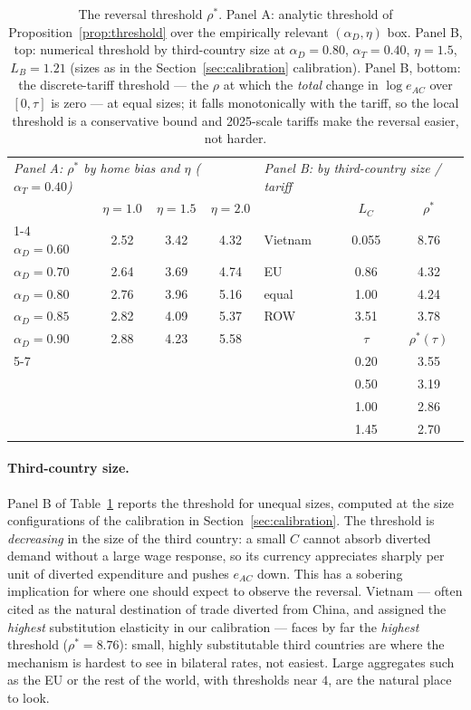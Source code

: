 \documentclass[11pt]{article}
\theoremstyle{plain}
\theoremstyle{remark}
\numberwithin{lemma}{section}
\numberwithin{proposition}{section}
\numberwithin{corollary}{section}
\newenvironment{revblock}{\par\begingroup\color{RevBlue}}{\endgroup\par}
\begin{document}
\begin{revblock}
\begin{table}[htbp]
\centering
\begin{tabular}{lccc@{\hspace{1.2cm}}lcc}
\hline\hline
\multicolumn{4}{l}{\textit{Panel A: $\rho^*$ by home bias and $\eta$ ($\alpha_T = 0.40$)}} & \multicolumn{3}{l}{\textit{Panel B: by third-country size / tariff}} \\[2pt]
 & $\eta = 1.0$ & $\eta = 1.5$ & $\eta = 2.0$ & & $L_C$ & $\rho^*$ \\
\cline{1-4}\cline{5-7}
$\alpha_D = 0.60$ & 2.52 & 3.42 & 4.32 & Vietnam & 0.055 & 8.76 \\
$\alpha_D = 0.70$ & 2.64 & 3.69 & 4.74 & EU & 0.86 & 4.32 \\
$\alpha_D = 0.80$ & 2.76 & 3.96 & 5.16 & equal & 1.00 & 4.24 \\
$\alpha_D = 0.85$ & 2.82 & 4.09 & 5.37 & ROW & 3.51 & 3.78 \\
$\alpha_D = 0.90$ & 2.88 & 4.23 & 5.58 & & $\tau$ & $\rho^*(\tau)$ \\
\cline{5-7}
 & & & & & 0.20 & 3.55 \\
 & & & & & 0.50 & 3.19 \\
 & & & & & 1.00 & 2.86 \\
 & & & & & 1.45 & 2.70 \\
\hline\hline
\end{tabular}
\caption{The reversal threshold $\rho^*$. Panel A: analytic threshold of Proposition~\ref{prop:threshold} over the empirically relevant $(\alpha_D, \eta)$ box. Panel B, top: numerical threshold by third-country size at $\alpha_D = 0.80$, $\alpha_T = 0.40$, $\eta = 1.5$, $L_B = 1.21$ (sizes as in the Section~\ref{sec:calibration} calibration). Panel B, bottom: the discrete-tariff threshold --- the $\rho$ at which the \emph{total} change in $\log e_{AC}$ over $[0, \tau]$ is zero --- at equal sizes; it falls monotonically with the tariff, so the local threshold is a conservative bound and 2025-scale tariffs make the reversal easier, not harder.}
\label{tab:rhostar_grid}
\end{table}

\paragraph{Third-country size.} Panel B of Table~\ref{tab:rhostar_grid} reports the threshold for unequal sizes, computed at the size configurations of the calibration in Section~\ref{sec:calibration}. The threshold is \emph{decreasing} in the size of the third country: a small $C$ cannot absorb diverted demand without a large wage response, so its currency appreciates sharply per unit of diverted expenditure and pushes $e_{AC}$ down. This has a sobering implication for where one should expect to observe the reversal. Vietnam --- often cited as the natural destination of trade diverted from China, and assigned the \emph{highest} substitution elasticity in our calibration --- faces by far the \emph{highest} threshold ($\rho^* = 8.76$): small, highly substitutable third countries are where the mechanism is hardest to see in bilateral rates, not easiest. Large aggregates such as the EU or the rest of the world, with thresholds near $4$, are the natural place to look.


\end{revblock}
\end{document}

